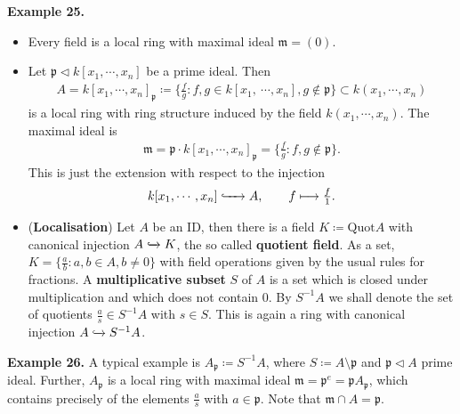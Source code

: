 \documentclass[12pt,a4paper,footinclude=true,headinclude=true]{scrbook} %
\newenvironment{example}[2][Example]
    { \begin{mdframed}[backgroundcolor=gray!20] \textbf{#1 #2.} }
    {  \end{mdframed}}
\begin{document}
\begin{example}{25}
    \begin{itemize}
        \item[(a)] Every field is a local ring with maximal ideal $\mathfrak{m}=(0)$.
        \item[(b)] Let $\mathfrak{p}\triangleleft k[x_1,\cdots,x_n]$ be a prime ideal. Then 
        \begin{align*}
            A=k[x_1,\cdots,x_n]_{\mathfrak{p}}\coloneqq
            \{\tfrac{f}{g}:f,g\in k[x_1,\ \cdots,x_n],g\notin\mathfrak{p}\}
            \subset k(x_1,\cdots,x_n)
        \end{align*}
        is a local ring with ring structure induced by the field $k(x_1,\cdots,x_n)$. The maximal ideal is 
        \begin{align*}
            \mathfrak{m}=\mathfrak{p}\cdot k[x_1,\cdots,x_n]_{\mathfrak{p}}=\{\tfrac{f}{g}:f,g\notin \mathfrak{p}\}.
        \end{align*}
        This is just the extension with respect to the injection
        \begin{align*}
            k[x_1,\cdots,x_n]\xhookrightarrow{~~~~} A,\qquad f\longmapsto\tfrac{f}{1}.
        \end{align*}
        \item[(c)] (\textbf{Localisation}) Let $A$ be an ID, then there is a field $K\coloneqq\mathrm{Quot}A$ with canonical injection $A\xhookrightarrow{} K$, the so called \textbf{quotient field}. As a set, $K=\{\frac{a}{b}:a,b\in A,b\neq0\}$ with field operations given by the usual rules for fractions. A \textbf{multiplicative subset} $S$ of $A$ is a set which is closed under multiplication and which does not contain $0$. By $S^{-1}A$ we shall denote the set of quotients $\frac{a}{s}\in S^{-1}A$ with $s\in S$. This is again a ring with canonical injection $A\xhookrightarrow{} S^{-1}A$.
    \end{itemize}
\end{example}

\begin{example}{26}
    A typical example is $A_{\mathfrak{p}}\coloneqq S^{-1}A$, where $S\coloneqq A\setminus\mathfrak{p}$ and $\mathfrak{p}\triangleleft A$ prime ideal. Further, $A_{\mathfrak{p}}$ is a local ring with maximal ideal $\mathfrak{m}=\mathfrak{p}^e=\mathfrak{p}A_{\mathfrak{p}}$, which contains precisely of the elements $\frac{a}{s}$ with $a\in\mathfrak{p}$. Note that $\mathfrak{m}\cap A=\mathfrak{p}$.
\end{example}
\end{document}
